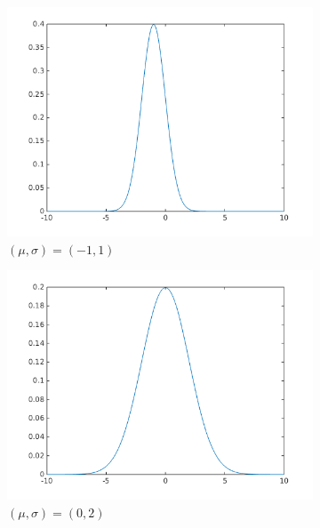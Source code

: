 \documentclass{article}
\begin{document}
\begin{figure}[!ht]
    \centering
    \begin{subfigure}[b]{0.4\textwidth}
        \includegraphics[width=\textwidth]{part1/I211.png}
        \caption{$(\mu, \sigma) = (-1,1)$}
    \end{subfigure}%
    \begin{subfigure}[b]{0.4\textwidth}
        \includegraphics[width=\textwidth]{part1/I212.png}
        \caption{$(\mu, \sigma) = (0,2)$}
    \end{subfigure}
    \begin{subfigure}[b]{0.4\textwidth}

\end{subfigure}
\end{figure}
\end{document}
